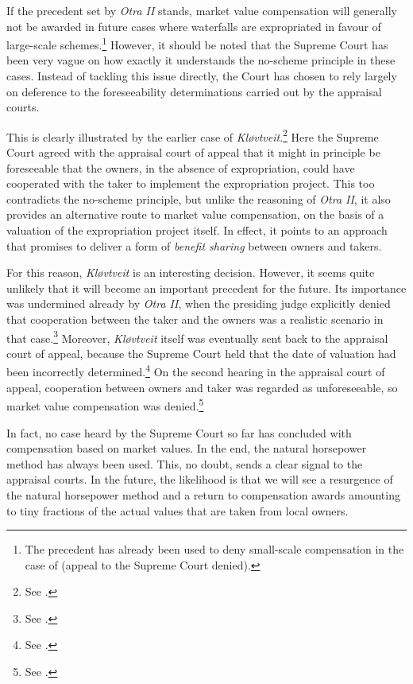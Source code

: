 If the precedent set by {\it Otra II} stands, market value compensation will generally not be awarded in future cases where waterfalls are expropriated in favour of large-scale schemes.\footnote{The precedent has already been used to deny small-scale compensation in the case of \cite{smibelg15} (appeal to the Supreme Court denied).} However, it should be noted that the Supreme Court has been very vague on how exactly it understands the no-scheme principle in these cases. Instead of tackling this issue directly, the Court has chosen to rely largely on deference to the foreseeability determinations carried out by the appraisal courts.

This is clearly illustrated by the earlier case of {\it Kløvtveit}.\footnote{See \cite{klovtveit11}.} Here the Supreme Court agreed with the appraisal court of appeal that it might in principle be foreseeable that the owners, in the absence of expropriation, could have cooperated with the taker to implement the expropriation project. This too contradicts the no-scheme principle, but unlike the reasoning of {\it Otra II}, it also provides an alternative route to market value compensation, on the basis of a valuation of the expropriation project itself. In effect, it points to an approach that promises to deliver a form of {\it benefit sharing} between owners and takers. 

For this reason, {\it Kløvtveit} is an interesting decision. However, it seems quite unlikely that it will become an important precedent for the future. Its importance was undermined already by {\it Otra II}, when the presiding judge explicitly denied that cooperation between the taker and the owners was a realistic scenario in that case.\footnote{See \cite[69-71]{otra13}.} Moreover, {\it Kløvtveit} itself was eventually sent back to the appraisal court of appeal, because the Supreme Court held that the date of valuation had been incorrectly determined.\footnote{See \cite[35-39]{klovtveit11}.} On the second hearing in the appraisal court of appeal, cooperation between owners and taker was regarded as unforeseeable, so market value compensation was denied.\footnote{See \cite{klovtveit13}.}

In fact, no case heard by the Supreme Court so far has concluded with compensation based on market values. In the end, the natural horsepower method has always been used. This, no doubt, sends a clear signal to the appraisal courts. In the future, the likelihood is that we will see a resurgence of the natural horsepower method and a return to compensation awards amounting to tiny fractions of the actual values that are taken from local owners.

